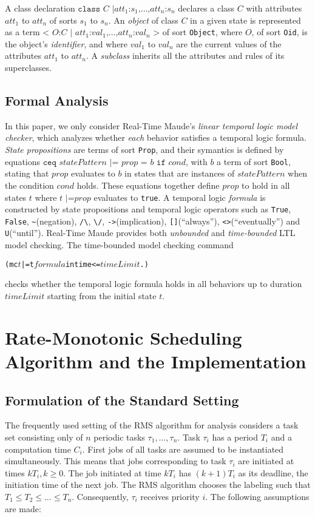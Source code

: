 \documentclass{llncs}
\begin{document}
A class declaration $\texttt{class }C\texttt{ |
}att_1\texttt{:}s_1\texttt{,}\ldots\texttt{,}att_n\texttt{:}s_n$
declares a class $C$ with attributes $att_1$ to $att_n$ of sorts $s_1$
to $s_n$. An \emph{object} of class $C$ in a given state is
represented as a term $\texttt{< } O\texttt{:} C \texttt{ | }
att_1\texttt{:}val_1\texttt{,} \ldots
\texttt{,}att_n\texttt{:}val_n\texttt{ >}$ of sort \verb|Object|,
where $O$, of sort \verb|Oid|, is the object's \emph{identifier}, and
where $val_1$ to $val_n$ are the current values of the attributes
$att_1$ to $att_n$. A \emph{subclass} inherits all the attributes and
rules of its superclasses.

\subsection{Formal Analysis}
In this paper, we only consider Real-Time Maude's \emph{linear
  temporal logic model checker}, which analyzes whether \emph{each}
behavior satisfies a temporal logic formula. \emph{State propositions}
are terms of sort \verb|Prop|, and their symantics is defined by
equations $\texttt{ceq } statePattern \texttt{ |= } prop \texttt{ = }
b \texttt{ if } cond$, with $b$ a term of sort \verb|Bool|, stating
that $prop$ evaluates to $b$ in states that are instances of
$statePattern$ when the condition $cond$ holds. These equations
together define $prop$ to hold in all states $t$ where $t \texttt{ |=
} prop$ evaluates to \verb|true|. A temporal logic \emph{formula} is
constructed by state propositions and temporal logic operators such as
\verb|True|, \verb|False|, \verb|~|(negation), \verb|/\|, \verb|\/|,
\verb|->|(implication), \verb|[]|(``always''),
\verb|<>|(``eventually'') and \verb|U|(``until''). Real-Time Maude
provides both \emph{unbounded} and \emph{time-bounded} LTL model
checking. The time-bounded model checking command
\begin{alltt}
  (mc \(t\) |=t \(formula\) in time <= \(timeLimit\) .)
\end{alltt}
checks whether the temporal logic formula holds in all behaviors up to
duration $timeLimit$ starting from the initial state $t$.

\section{Rate-Monotonic Scheduling Algorithm and the Implementation}

\subsection{Formulation of the Standard Setting}
The frequently used setting of the RMS algorithm for analysis
considers a task set consisting only of $n$ periodic tasks
$\tau_1,\ldots,\tau_n$. Task $\tau_i$ has a period $T_i$ and a
computation time $C_i$. First jobs of all tasks are assumed to be
instantiated simultaneously.  This means that jobs corresponding to
task $\tau_i$ are initiated at times $kT_i, k\ge 0$. The job initiated
at time $kT_i$ has $(k+1)T_i$ as its deadline, the initiation time of
the next job. The RMS algorithm chooses the labeling such that $T_1\le
T_2\le \ldots \le T_n$. Consequently, $\tau_i$ receives priority
$i$. The following assumptions are made:
\end{document}
